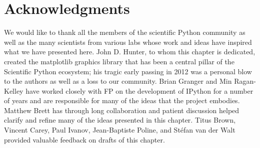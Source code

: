 \documentclass[ChapterTOCs,krantz2]{krantz} %
\begin{document}
\section*{Acknowledgments}

We would like to thank all the members of the scientific Python community as
well as the many scientists from various labs whose work and ideas have inspired
what we have presented here.  John D. Hunter, to whom this chapter is dedicated,
created the matplotlib graphics library that has been a central pillar of the
Scientific Python ecosystem; his tragic early passing in 2012 was a personal
blow to the authors as well as a loss to our community.  Brian Granger and Min
Ragan-Kelley have worked closely with FP on the development of IPython for a
number of years and are responsible for many of the ideas that the project
embodies.  Matthew Brett has through long collaboration and patient
discussion helped clarify and refine many of the ideas presented in this
chapter.  Titus Brown, Vincent Carey, Paul Ivanov, Jean-Baptiste Poline, and
Stéfan van der Walt provided valuable feedback on drafts of this chapter.



\end{document}
